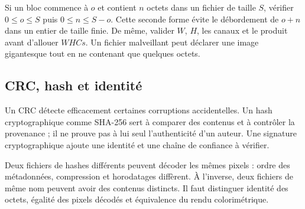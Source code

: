 Si un bloc commence à $o$ et contient $n$ octets dans un fichier
de taille $S$, vérifier $0\le o\le S$ puis $0\le n\le S-o$.
Cette seconde forme évite le débordement de $o+n$ dans un entier
de taille finie. De même, valider $W$, $H$, les canaux et le produit
avant d'allouer $WHCs$. Un fichier malveillant peut déclarer une
image gigantesque tout en ne contenant que quelques octets.

\subsection{CRC, hash et identité}
Un CRC détecte efficacement certaines corruptions accidentelles.
Un hash cryptographique comme SHA-256 sert à comparer des contenus
et à contrôler la provenance ; il ne prouve pas à lui seul
l'authenticité d'un auteur. Une signature cryptographique ajoute
une identité et une chaîne de confiance à vérifier.

Deux fichiers de hashes différents peuvent décoder les mêmes
pixels : ordre des métadonnées, compression et horodatages
diffèrent. À l'inverse, deux fichiers de même nom peuvent avoir
des contenus distincts. Il faut distinguer identité des octets,
égalité des pixels décodés et équivalence du rendu colorimétrique.

